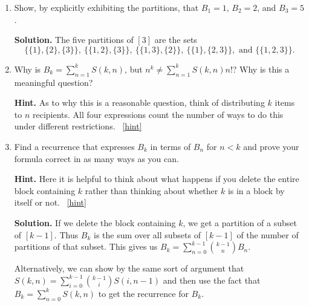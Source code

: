 \documentclass{book}
\begin{document}
\setcounter{project}{206}
\addtocounter{project}{-1}
\begin{activity}[]\label{BellNumberIntro}
\leavevmode%
\begin{enumerate}[font=\bfseries,label=(\alph*),ref=\alph*]
\item\label{task-216} \hypertarget{p-1136}{}%
Show, by explicitly exhibiting the partitions, that \(B_1 = 1\), \(B_2 = 2\), and \(B_3 = 5\).%
\par\smallskip%
\noindent\textbf{Solution.}\hypertarget{solution-105}{}\quad%
\hypertarget{p-1137}{}%
The five partitions of \([3]\) are the sets%
\begin{equation*}
\{\{1\},
\{2\},\{3\}\},\
\{\{1,2\},\{3\}\},\ \{\{1,3\},\{2\}\},\ \{\{1\},\{2,3\}\},\text{ and }
\{\{1,2,3\}\}\text{.}
\end{equation*}
%
\item\label{task-217} \hypertarget{p-1138}{}%
Why is \(B_k = \sum_{n=1}^{k} S(k,n)\), but \(n^k \ne \sum_{n=1}^k S(k,n)n!\)?  Why is this a meaningful question?%
\par\smallskip%
\noindent\textbf{Hint.}\hypertarget{hint-130}{}\quad%
\hypertarget{p-1139}{}%
As to why this is a reasonable question, think of distributing \(k\) items to \(n\) recipients.  All four expressions count the number of ways to do this under different restrictions.%
~\hfill{\tiny\hyperlink{a-206.b}{[hint]}\hypertarget{q-206.b}{}}\item\label{task-218} \hypertarget{p-1140}{}%
Find a recurrence that expresses \(B_k\) in terms of \(B_n\) for \(n\lt  k\) and prove your formula correct in as many ways as you can.%
\par\smallskip%
\noindent\textbf{Hint.}\hypertarget{hint-131}{}\quad%
\hypertarget{p-1141}{}%
Here it is helpful to think about what happens if you delete the entire block containing \(k\) rather than thinking about whether \(k\) is in a block by itself or not.%
~\hfill{\tiny\hyperlink{a-206.c}{[hint]}\hypertarget{q-206.c}{}}\par\smallskip%
\noindent\textbf{Solution.}\hypertarget{solution-106}{}\quad%
\hypertarget{p-1142}{}%
If we delete the block containing \(k\), we get a partition of a subset of \([k-1]\). Thus \(B_k\) is the sum over all subsets of \([k-1]\) of the number of partitions of that subset. This gives us \(B_k= \sum_{n=0}^{k-1}\binom{k-1}{n}B_n\).%
\par
\hypertarget{p-1143}{}%
Alternatively, we can show by the same sort of argument that \(S(k,n)=\sum_{i=0}^{k-1} \binom{k-1}{i}S(i,n-1)\) and then use the fact that \(B_k =\sum_{n=0}^k S(k,n)\) to get the recurrence for \(B_k\).%

\end{enumerate}
\end{activity}
\end{document}
